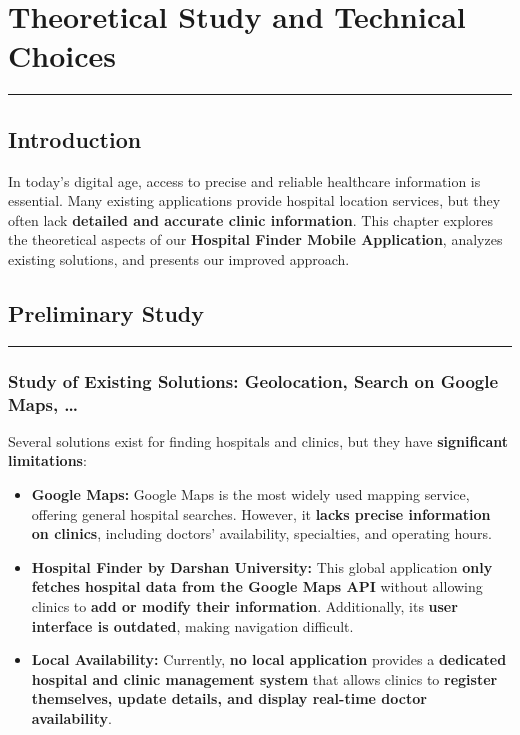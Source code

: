 \documentclass[12pt]{report}
\begin{document}
\newpage

\chapter{\textbf{Theoretical Study and Technical Choices}}  
\rule{\linewidth}{1.5pt} 


\section{\textbf{Introduction}}  

In today's digital age, access to precise and reliable healthcare information is essential. Many existing applications provide hospital location services, but they often lack \textbf{detailed and accurate clinic information}.  
This chapter explores the theoretical aspects of our \textbf{Hospital Finder Mobile Application}, analyzes existing solutions, and presents our improved approach.  

\section{\textbf{Preliminary Study}}  
\vspace{-0.5cm}
\rule{7.5cm}{1.5pt}
\vspace{-0.5cm}
\subsection{\textbf{Study of Existing Solutions: Geolocation, Search on Google Maps, …}}  

Several solutions exist for finding hospitals and clinics, but they have \textbf{significant limitations}:  

\begin{itemize}
    \item \textbf{Google Maps:}  
    Google Maps is the most widely used mapping service, offering general hospital searches. However, it \textbf{lacks precise information on clinics}, including doctors' availability, specialties, and operating hours.  
    \item \textbf{Hospital Finder by Darshan University:}  
    This global application \textbf{only fetches hospital data from the Google Maps API} without allowing clinics to \textbf{add or modify their information}. Additionally, its \textbf{user interface is outdated}, making navigation difficult.  
    \item \textbf{Local Availability:}  
    Currently, \textbf{no local application} provides a \textbf{dedicated hospital and clinic management system} that allows clinics to \textbf{register themselves, update details, and display real-time doctor availability}.
\end{itemize}
\end{document}

